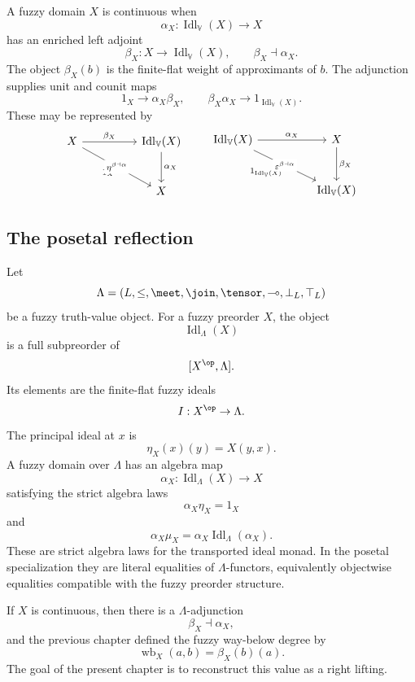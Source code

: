 A fuzzy domain \(X\) is continuous when
\[
    \alpha_X:
    \operatorname{Idl}_{\mathbb V}(X)
    \to
    X
\]
has an enriched left adjoint
\[
    \beta_X:X\to \operatorname{Idl}_{\mathbb V}(X),
    \qquad
    \beta_X\dashv\alpha_X.
\]
The object \(\beta_X(b)\) is the finite-flat weight of approximants of \(b\). The
adjunction supplies unit and counit maps
\[
    1_X\to \alpha_X\beta_X,
    \qquad
    \beta_X\alpha_X\to 1_{\operatorname{Idl}_{\mathbb V}(X)}.
\]
These may be represented by
\[
\begin{tikzcd}[column sep=huge,row sep=large]
X
    \ar[r,"\beta_X"]
    \ar[dr,"1_X"']
&
\operatorname{Idl}_{\mathbb V}(X)
    \ar[d,"\alpha_X"]
\\
&
X
\ar[ul,phantom,"\scriptstyle\eta^{\beta\dashv\alpha}" description]
\end{tikzcd}
\qquad
\begin{tikzcd}[column sep=huge,row sep=large]
\operatorname{Idl}_{\mathbb V}(X)
    \ar[r,"\alpha_X"]
    \ar[dr,"1_{\operatorname{Idl}_{\mathbb V}(X)}"']
&
X
    \ar[d,"\beta_X"]
\\
&
\operatorname{Idl}_{\mathbb V}(X)
\ar[ul,phantom,"\scriptstyle\varepsilon^{\beta\dashv\alpha}" description]
\end{tikzcd}
\]

\subsection{The posetal reflection}
\label{subsec:inherited-data-posetal}

Let
\[
    \Lambda=(L,\leq,\meet,\join,\tensor,\multimap,\bot_L,\top_L)
\]
be a fuzzy truth-value object. For a fuzzy preorder \(X\), the object
\[
    \operatorname{Idl}_\Lambda(X)
\]
is a full subpreorder of
\[
    [X^{\op},\Lambda].
\]
Its elements are the finite-flat fuzzy ideals
\[
    I:X^{\op}\to \Lambda.
\]
The principal ideal at \(x\) is
\[
    \eta_X(x)(y)=X(y,x).
\]
A fuzzy domain over \(\Lambda\) has an algebra map
\[
    \alpha_X:
    \operatorname{Idl}_\Lambda(X)
    \to
    X
\]
satisfying the strict algebra laws
\[
    \alpha_X\eta_X=1_X
\]
and
\[
    \alpha_X\mu_X
    =
    \alpha_X\operatorname{Idl}_\Lambda(\alpha_X).
\]
These are strict algebra laws for the transported ideal monad. In the posetal
specialization they are literal equalities of \(\Lambda\)-functors, equivalently
objectwise equalities compatible with the fuzzy preorder structure.

If \(X\) is continuous, then there is a \(\Lambda\)-adjunction
\[
    \beta_X\dashv\alpha_X,
\]
and the previous chapter defined the fuzzy way-below degree by
\[
    \operatorname{wb}_X(a,b)=\beta_X(b)(a).
\]
The goal of the present chapter is to reconstruct this value as a right lifting.

